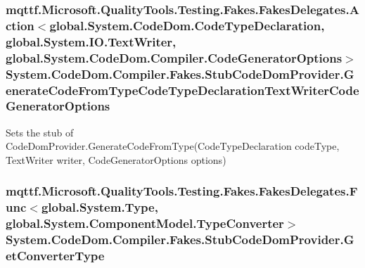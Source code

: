 \hypertarget{class_system_1_1_code_dom_1_1_compiler_1_1_fakes_1_1_stub_code_dom_provider_a1b709892dc0772bd2ccbb997f96e3467}{
\subsubsection[{Generate\-Code\-From\-Type\-Code\-Type\-Declaration\-Text\-Writer\-Code\-Generator\-Options}]{\setlength{\rightskip}{0pt plus 5cm}mqttf.\-Microsoft.\-Quality\-Tools.\-Testing.\-Fakes.\-Fakes\-Delegates.\-Action$<$global.\-System.\-Code\-Dom.\-Code\-Type\-Declaration, global.\-System.\-I\-O.\-Text\-Writer, global.\-System.\-Code\-Dom.\-Compiler.\-Code\-Generator\-Options$>$ System.\-Code\-Dom.\-Compiler.\-Fakes.\-Stub\-Code\-Dom\-Provider.\-Generate\-Code\-From\-Type\-Code\-Type\-Declaration\-Text\-Writer\-Code\-Generator\-Options}}\label{class_system_1_1_code_dom_1_1_compiler_1_1_fakes_1_1_stub_code_dom_provider_a1b709892dc0772bd2ccbb997f96e3467}


Sets the stub of Code\-Dom\-Provider.\-Generate\-Code\-From\-Type(\-Code\-Type\-Declaration code\-Type, Text\-Writer writer, Code\-Generator\-Options options)

\hypertarget{class_system_1_1_code_dom_1_1_compiler_1_1_fakes_1_1_stub_code_dom_provider_a3ba8a4f6dff6648166e1cce2732b4461}{
\subsubsection[{Get\-Converter\-Type}]{\setlength{\rightskip}{0pt plus 5cm}mqttf.\-Microsoft.\-Quality\-Tools.\-Testing.\-Fakes.\-Fakes\-Delegates.\-Func$<$global.\-System.\-Type, global.\-System.\-Component\-Model.\-Type\-Converter$>$ System.\-Code\-Dom.\-Compiler.\-Fakes.\-Stub\-Code\-Dom\-Provider.\-Get\-Converter\-Type}}\label{class_system_1_1_code_dom_1_1_compiler_1_1_fakes_1_1_stub_code_dom_provider_a3ba8a4f6dff6648166e1cce2732b4461}


